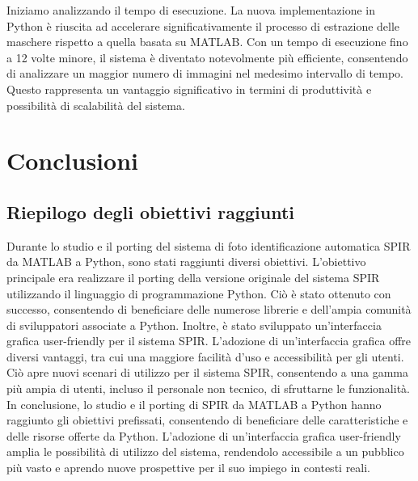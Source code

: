 \documentclass[a4paper,12pt]{report}
\begin{document}
    Iniziamo analizzando il tempo di esecuzione. La nuova implementazione in Python è riuscita ad accelerare significativamente il processo di estrazione delle maschere rispetto a quella basata su MATLAB. Con un tempo di esecuzione fino a 12 volte minore, il sistema è diventato notevolmente più efficiente, consentendo di analizzare un maggior numero di immagini nel medesimo intervallo di tempo. Questo rappresenta un vantaggio significativo in termini di produttività e possibilità di scalabilità del sistema.
      
\chapter{Conclusioni}
  \section{Riepilogo degli obiettivi raggiunti}
    Durante lo studio e il porting del sistema di foto identificazione automatica SPIR da MATLAB a Python, sono stati raggiunti diversi obiettivi. L'obiettivo principale era realizzare il porting della versione originale del sistema SPIR utilizzando il linguaggio di programmazione Python. Ciò è stato ottenuto con successo, consentendo di beneficiare delle numerose librerie e dell'ampia comunità di sviluppatori associate a Python.
    Inoltre, è stato sviluppato un'interfaccia grafica user-friendly per il sistema SPIR. L'adozione di un'interfaccia grafica offre diversi vantaggi, tra cui una maggiore facilità d'uso e accessibilità per gli utenti. Ciò apre nuovi scenari di utilizzo per il sistema SPIR, consentendo a una gamma più ampia di utenti, incluso il personale non tecnico, di sfruttarne le funzionalità.
    In conclusione, lo studio e il porting di SPIR da MATLAB a Python hanno raggiunto gli obiettivi prefissati, consentendo di beneficiare delle caratteristiche e delle risorse offerte da Python. L'adozione di un'interfaccia grafica user-friendly amplia le possibilità di utilizzo del sistema, rendendolo accessibile a un pubblico più vasto e aprendo nuove prospettive per il suo impiego in contesti reali.
\end{document}
